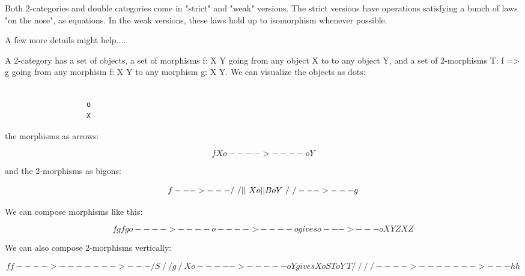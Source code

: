Both 2-categories and double categories come in "strict" and
"weak" versions.  The strict versions have operations
satisfying a bunch of laws "on the nose", as equations.  In
the weak versions, these laws hold up to isomorphism whenever
possible.

A few more details might help....

A 2-category has a set of objects, a set of morphisms f: X \to  Y going 
from any object X to to any object Y, and a set of 2-morphisms T: f => g 
going from any morphism f: X \to  Y to any morphism g: X \to  Y.  We can 
visualize the objects as dots: 


\begin{verbatim}

                   o 
                   X
\end{verbatim}
    
the morphisms as arrows:


$$

                   f           
            X o---->----o Y
$$
    
and the 2-morphisms as bigons:


$$

                   f 
                --->---
               /       \
              /   ||    \
           X o    ||B   o Y
              \   \/    /
               \       /
                --->---
                   g
$$
    

We can compose morphisms like this:


$$

            f         g                                  fg
       o---->----o---->----o             gives       o--->---o
       X         Y         Z                         X       Z
$$
    

We can also compose 2-morphisms vertically:


$$

                 f                                          f
             ---->----                                 --->---  
            /  S      \                               /       \
           /     g     \                             /         \
        X o ----->----- o Y              gives    X o     ST    o Y
           \   T       /                             \         /
            \         /                               \       /   
             ---->----                                 --->---
                 h                                        h
$$
    
